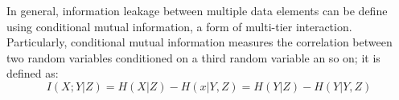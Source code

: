 In general, information leakage between multiple data elements can be define using conditional mutual information, a form of multi-tier interaction. Particularly, conditional mutual information measures the correlation between two random variables conditioned on a third random variable an so on; it is defined as:
\begin{equation} 
I(X; Y|Z) = H(X|Z)-H(x|Y,Z)= H(Y|Z) - H(Y|Y,Z)
\end{equation} 